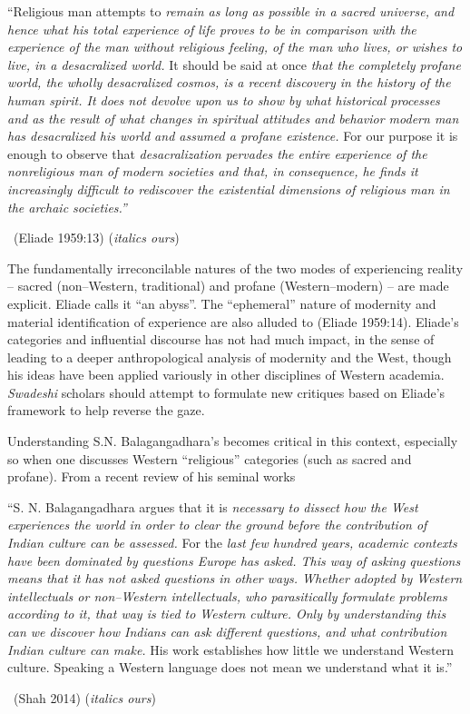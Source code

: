 \begin{myquote}
“Religious man attempts to \textit{remain as long as possible in a sacred universe, and hence what his total experience of life proves to be in comparison with the experience of the man without religious feeling, of the man who lives, or wishes to live, in a desacralized world.} It should be said at once \textit{that the completely profane world, the wholly desacralized cosmos, is a recent discovery in the history of the human spirit. It does not devolve upon us to show by what historical processes and as the result of what changes in spiritual attitudes and behavior modern man has desacralized his world and assumed a profane existence.} For our purpose it is enough to observe that \textit{desacralization pervades the entire experience of the nonreligious man of modern societies and that, in consequence, he finds it increasingly difficult to rediscover the existential dimensions of religious man in the archaic societies.”} 

~\hfill (Eliade 1959:13) (\textit{italics ours})
\end{myquote}

The fundamentally irreconcilable natures of the two modes of experiencing reality – sacred (non–Western, traditional) and profane (Western–modern) – are made explicit. Eliade calls it “an abyss”. The “ephemeral” nature of modernity and material identification of experience are also alluded to (Eliade 1959:14). Eliade's categories and influential discourse has not had much impact, in the sense of leading to a deeper anthropological analysis of modernity and the West, though his ideas have been applied variously in other disciplines of Western academia. \textit{Swadeshi} scholars should attempt to formulate new critiques based on Eliade's framework to help reverse the gaze.

Understanding S.N. Balagangadhara's becomes critical in this context, especially so when one discusses Western “religious” categories (such as sacred and profane). From a recent review of his seminal works

\begin{myquote}
“S. N. Balagangadhara argues that it is \textit{necessary to dissect how the West experiences the world in order to clear the ground before the contribution of Indian culture can be assessed.} For the \textit{last few hundred years, academic contexts have been dominated by questions Europe has asked. This way of asking questions means that it has not asked questions in other ways. Whether adopted by Western intellectuals or non–Western intellectuals, who parasitically formulate problems according to it, that way is tied to Western culture. Only by understanding this can we discover how Indians can ask different questions, and what contribution Indian culture can make.} His work establishes how little we understand Western culture. Speaking a Western language does not mean we understand what it is.” 

~\hfill (Shah 2014) (\textit{italics ours})
\end{myquote}

